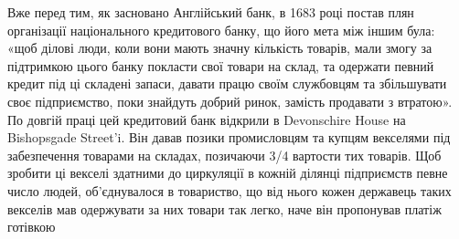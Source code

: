Вже перед тим, як засновано Англійський банк, в 1683 році постав плян
організації національного кредитового банку, що його мета між іншим була:
«щоб ділові люди, коли вони мають значну кількість товарів, мали змогу за
підтримкою цього банку покласти свої товари на склад, та одержати певний
кредит під ці складені запаси, давати працю своїм службовцям та збільшувати
своє підприємство, поки знайдуть добрий ринок, замість продавати з втратою».
По довгій праці цей кредитовий банк відкрили в Devonschire House на Bishopsgade
Street'i. Він давав позики промисловцям та купцям векселями під забезпечення
товарами на складах, позичаючи 3/4 вартости тих товарів. Щоб зробити
ці векселі здатними до циркуляції в кожній ділянці підприємств певне число
людей, об’єднувалося в товариство, що від нього кожен державець таких векселів
мав одержувати за них товари так легко, наче він пропонував платіж готівкою
\parbreak{}  %
